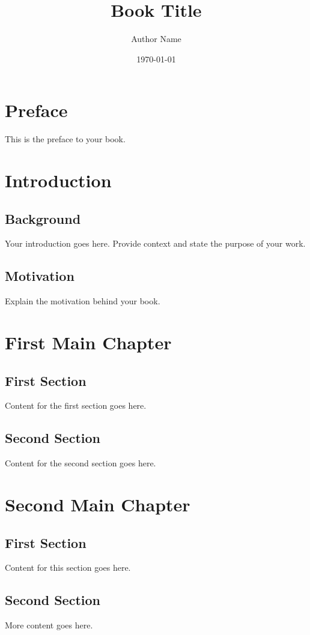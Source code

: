 \documentclass[12pt, letterpaper]{book}
\title{Book Title}
\author{Author Name}
\date{\today}
\begin{document}
\frontmatter
\maketitle

\tableofcontents

\chapter{Preface}
This is the preface to your book.

\mainmatter

\chapter{Introduction}
\section{Background}
Your introduction goes here. Provide context and state the purpose of your work.

\section{Motivation}
Explain the motivation behind your book.

\chapter{First Main Chapter}
\section{First Section}
Content for the first section goes here.

\section{Second Section}
Content for the second section goes here.

\chapter{Second Main Chapter}
\section{First Section}
Content for this section goes here.

\section{Second Section}
More content goes here.
\end{document}
